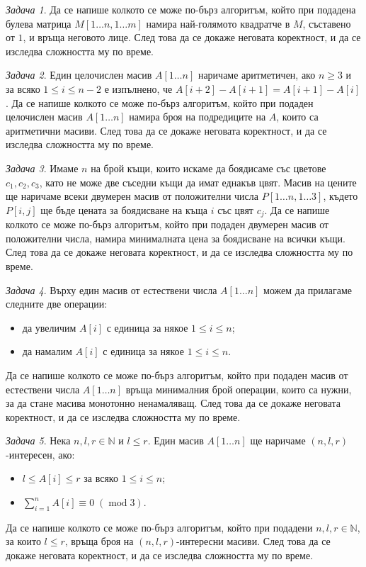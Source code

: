 \documentclass{article}
\newcommand{\N}{\mathbb{N}}
\theoremstyle{definition}
\theoremstyle{plain}
\theoremstyle{remark}
\newtheorem{problem}{Задача}
\theoremstyle{definition}
\begin{document}
\begin{problem}
Да се напише колкото се може по-бърз алгоритъм, който при подадена булева матрица $M[1 \dots n, 1 \dots m]$ намира най-голямото квадратче в $M$, съставено от $1$, и връща неговото лице.
След това да се докаже неговата коректност, и да се изследва сложността му по време.
\end{problem}

\begin{problem}
Един целочислен масив $A[1 \dots n]$ наричаме аритметичен, ако $n \geq 3$ и за всяко $1 \leq i \leq n - 2$ е изпълнено, че $A[i + 2] - A[i + 1] = A[i + 1] - A[i]$.
Да се напише колкото се може по-бърз алгоритъм, който при подаден целочислен масив $A[1 \dots n]$ намира броя на подредиците на $A$, които са аритметични масиви.
След това да се докаже неговата коректност, и да се изследва сложността му по време.
\end{problem}

\begin{problem}
Имаме $n$ на брой къщи, които искаме да боядисаме със цветове $c_1, c_2, c_3$, като не може две съседни къщи да имат еднакъв цвят.
Масив на цените ще наричаме всеки двумерен масив от положителни числа $P[1 \dots n, 1 \dots 3]$, където $P[i, j]$ ще бъде цената за боядисване на къща $i$ със цвят $c_j$.
Да се напише колкото се може по-бърз алгоритъм, който при подаден двумерен масив от положителни числа, намира минималната цена за боядисване на всички къщи.
След това да се докаже неговата коректност, и да се изследва сложността му по време.
\end{problem}

\begin{problem}
Върху един масив от естествени числа $A[1 \dots n]$ можем да прилагаме следните две операции:
\begin{itemize}
  \item да увеличим $A[i]$ с единица за някое $1 \leq i \leq n$;
  \item да намалим $A[i]$ с единица за някое $1 \leq i \leq n$.
\end{itemize}
Да се напише колкото се може по-бърз алгоритъм, който при подаден масив от естествени числа $A[1 \dots n]$ връща минималния брой операции, които са нужни, за да стане масива монотонно ненамаляващ.
След това да се докаже неговата коректност, и да се изследва сложността му по време.
\end{problem}

\begin{problem}
Нека $n, l, r \in \N$ и $l \leq r$.
Един масив $A[1 \dots n]$ ще наричаме $(n, l, r)$-интересен, ако:
\begin{itemize}
  \item $l \leq A[i] \leq r$ за всяко $1 \leq i \leq n$;
  \item $\sum\limits_{i = 1}^n A[i] \equiv 0 \; (\operatorname{mod} 3)$.
\end{itemize}
Да се напише колкото се може по-бърз алгоритъм, който при подадени $n, l, r \in \N$, за които $l \leq r$, връща броя на $(n, l, r)$-интересни масиви.
След това да се докаже неговата коректност, и да се изследва сложността му по време.
\end{problem}
\end{document}
